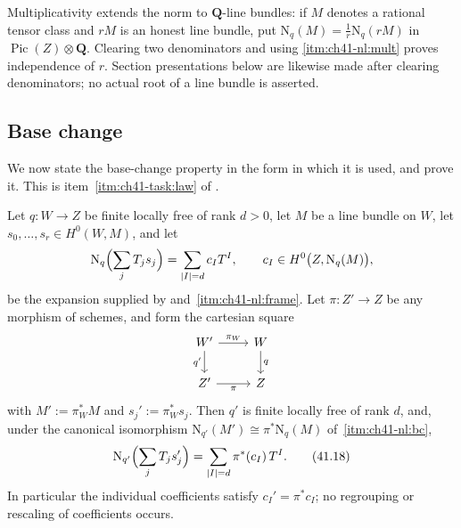 Multiplicativity extends the norm to $\mathbf Q$-line bundles:
if $M$ denotes a rational tensor class and $rM$ is an honest line
bundle, put $\mathrm N_q(M)=\frac1r\mathrm N_q(rM)$ in
$\operatorname{Pic}(Z)\otimes\mathbf Q$.  Clearing two denominators
and using \cref{itm:ch41-nl:mult} proves independence of $r$.
Section presentations below are likewise made after clearing
denominators; no actual root of a line bundle is asserted.

\subsection{Base change}
\label{sec:ch41-base-change}

We now state the base-change property in the form in which it is used, and
prove it.  This is item~\cref{itm:ch41-task:law} of
.

\begin{proposition}
\label{prop:ch41-norm-base-change}
Let $q:W\to Z$ be finite locally free of rank $d>0$, let $M$ be a
line bundle on $W$, let $s_0,\dots,s_r\in H^0(W,M)$, and let
\[
 \mathrm N_q\Bigl(\sum_jT_js_j\Bigr)=\sum_{|I|=d}c_IT^I,
 \qquad
 c_I\in H^0\bigl(Z,\mathrm N_q(M)\bigr),
\]
be the expansion supplied by  and
\,\cref{itm:ch41-nl:frame}.  Let
$\pi:Z'\to Z$ be any morphism of schemes, and form the cartesian square
\[
\begin{tikzcd}
W'\arrow[r,"\pi_W"]\arrow[d,"q'"']&W\arrow[d,"q"]\\
Z'\arrow[r,"\pi"']&Z
\end{tikzcd}
\]
with $M':=\pi_W^*M$ and $s_j':=\pi_W^*s_j$.  Then $q'$ is finite
locally free of rank $d$, and, under the canonical isomorphism
$\mathrm N_{q'}(M')\cong\pi^*\mathrm N_q(M)$ of
\,\cref{itm:ch41-nl:bc},
\[
 \mathrm N_{q'}\Bigl(\sum_jT_js_j'\Bigr)=\sum_{|I|=d}\pi^*(c_I)\,T^I .
\tag{41.18}\label{eq:ch41-base-change-coefficients}
\]
In particular the individual coefficients satisfy $c_I'=\pi^*c_I$; no
regrouping or rescaling of coefficients occurs.
\end{proposition}

